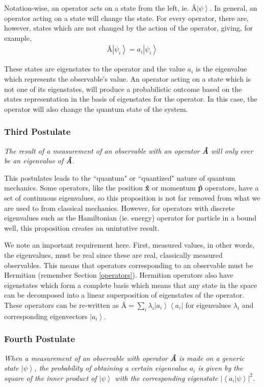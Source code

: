 \documentclass[11pt]{article} %
\newcommand{\bra}[1]{\left\langle #1 \right|}
\newcommand{\ket}[1]{\left|#1\right\rangle}
\newcommand{\braket}[2]{\left\langle#1 |  #2\right\rangle}
\begin{document}
Notation-wise, an operator acts on a state from the left, ie. $\textrm{\^A}\ket{\psi}$. In general, an operator acting on a state will change the state. For every operator, there are, however, states which are not changed by the action of the operator, giving, for example,
\begin{align}
\textbf{\^A}\ket{\psi_i} = a_i\ket{\psi_i}
\end{align}

\noindent These states are eigenstates to the operator and the value $a_i$ is the eigenvalue which represents the observable's value. An operator acting on a state which is not one of its eigenstates, will produce a probabilistic outcome based on the states representation in the basis of eigenstates for the operator. In this case, the operator will also change the quantum state of the system.

\subsubsection{Third Postulate} \label{third_pos}
\begin{center}
    \textit{The result of a measurement of an observable with an operator \textbf{\^A} will only ever be an eigenvalue of \textbf{\^A}.}
\end{center}

This postulates leads to the ``quantum" or ``quantized" nature of quantum mechanics. Some operators, like the position \textbf{\^x} or momentum \textbf{\^p} operators, have a set of continuous eigenvalues, so this proposition is not far removed from what we are used to from classical mechanics. However, for operators with discrete eigenvalues such as the Hamiltonian (ie. energy) operator for particle in a bound well, this proposition creates an unintutive result.

We note an important requirement here. First, measured values, in other words, the eigenvalues, must be real since these are real, classically measured observables. This means that operators corresponding to an observable must be Hermitian (remember Section \ref{operators}). Hermitian operators also have eigenstates which form a complete basis which means that any state in the space can be decomposed into a linear superposition of eigenstates of the operator. These operators can be re-written as $\textbf{\^A} = \sum_i\lambda_i\ket{a_i}\bra{a_i}$ for eigenvalues $\lambda_i$ and corresponding eigenvectors $\ket{a_i}$.

\subsubsection{Fourth Postulate} \label{fourth_pos}
\begin{center}
    \textit{When a measurement of an observable with operator \textbf{\^A} is made on a generic state $\ket{\psi}$, the probability of obtaining a certain eigenvalue $a_i$ is given by the square of the inner product of $\ket{\psi}$ with the corresponding eigenstate $\left|\braket{a_i}{\psi}\right|^2$.}
\end{center}
\end{document}

